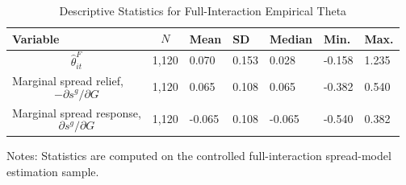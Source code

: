 \begin{table}[H]\centering
\begin{threeparttable}
\caption{Descriptive Statistics for Full-Interaction Empirical Theta}
\label{tab:theta_descriptive_stats}
\scriptsize
\begin{tabularx}{\textwidth}{lYYYYYY}
\toprule
Variable & $$N$$ & Mean & SD & Median & Min. & Max. \\
\midrule
$$\widehat{\theta}^{F}_{it}$$ & 1,120 & 0.070 & 0.153 & 0.028 & -0.158 & 1.235 \\
Marginal spread relief, $$-\partial s^g/\partial G$$ & 1,120 & 0.065 & 0.108 & 0.065 & -0.382 & 0.540 \\
Marginal spread response, $$\partial s^g/\partial G$$ & 1,120 & -0.065 & 0.108 & -0.065 & -0.540 & 0.382 \\
\bottomrule
\end{tabularx}
\begin{tablenotes}[flushleft]\footnotesize
\item Notes: Statistics are computed on the controlled full-interaction spread-model estimation sample.
\end{tablenotes}
\end{threeparttable}
\end{table}
